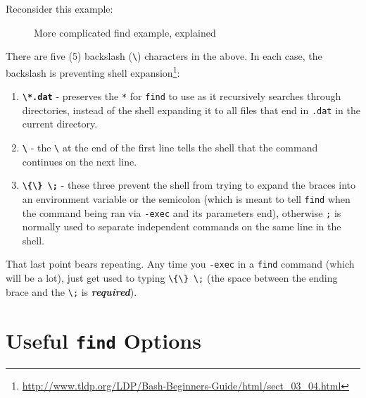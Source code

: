 \documentclass[10pt,american,]{book}
\newenvironment{Shaded}{\begin{snugshade}}{\end{snugshade}}
\newcommand{\KeywordTok}[1]{\textcolor[rgb]{0.13,0.29,0.53}{\textbf{{#1}}}}
\newcommand{\DataTypeTok}[1]{\textcolor[rgb]{0.13,0.29,0.53}{{#1}}}
\newcommand{\NormalTok}[1]{{#1}}
\renewcommand{\href}[2]{#2\footnote{\url{#1}}}
\numberwithin{figure}{chapter}
\DeclareRobustCommand{\drcap}[1]{\begin{figure}[H]\caption{#1}\end{figure}}
\renewcommand{\KeywordTok}[1]{{#1}}
\renewcommand{\DataTypeTok}[1]{{#1}}
\renewcommand{\NormalTok}[1]{{#1}}
\begin{document}
Reconsider this example:

\drcap{More complicated find example, explained}

\begin{Shaded}
\end{Shaded}

There are five (5) backslash (\texttt{\textbackslash{}}) characters in
the above. In each case, the backslash is preventing
\href{http://www.tldp.org/LDP/Bash-Beginners-Guide/html/sect_03_04.html}{shell
expansion}:

\begin{enumerate}
\def\labelenumi{\arabic{enumi}.}
\item
  \textbf{\texttt{\textbackslash{}*.dat}} - preserves the \texttt{*} for
  \texttt{find} to use as it recursively searches through directories,
  instead of the shell expanding it to all files that end in
  \texttt{.dat} in the current directory.
\item
  \textbf{\texttt{\textbackslash{}}} - the \texttt{\textbackslash{}} at
  the end of the first line tells the shell that the command continues
  on the next line.
\item
  \textbf{\texttt{\textbackslash{}\{\textbackslash{}\}\ \textbackslash{};}}
  - these three prevent the shell from trying to expand the braces into
  an environment variable or the semicolon (which is meant to tell
  \texttt{find} when the command being ran via \texttt{-exec} and its
  parameters end), otherwise \texttt{;} is normally used to separate
  independent commands on the same line in the shell.
\end{enumerate}

That last point bears repeating. Any time you \texttt{-exec} in a
\texttt{find} command (which will be a lot), just get used to typing
\texttt{\textbackslash{}\{\textbackslash{}\}\ \textbackslash{};} (the
space between the ending brace and the \texttt{\textbackslash{};} is
\textbf{\emph{required}}).

\section*{\texorpdfstring{Useful \texttt{find}
Options}{Useful find Options}}\label{useful-find-options}
\end{document}
